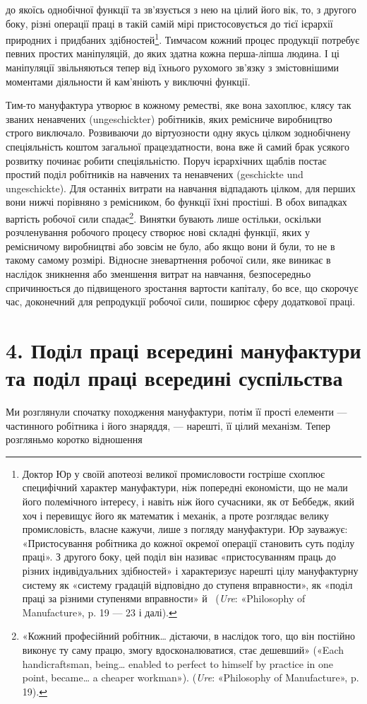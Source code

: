 \parcont{}  %
до якоїсь однобічної функції та зв’язується з нею на цілий його
вік, то, з другого боку, різні операції праці в такій самій мірі
пристосовується до тієї ієрархії природних і придбаних здібностей\footnote{
Доктор Юр у своїй апотеозі великої промисловости гостріше
схоплює специфічний характер мануфактури, ніж попередні економісти,
що не мали його полемічного інтересу, і навіть ніж його сучасники,
як от Беббедж, який хоч і перевищує його як математик і механік, а проте
розглядає велику промисловість, власне кажучи, лише з погляду мануфактури.
Юр зауважує: «Пристосування робітника до кожної окремої
операції становить суть поділу праці». З другого боку, цей поділ він називає
«пристосуванням праць до різних індивідуальних здібностей» і характеризує
нарешті цілу мануфактурну систему як «систему градацій
відповідно до ступеня вправности», як «поділ праці за різними ступенями
вправности» й~ (\emph{Ure}: «Philosophy of Manufacture», p. 19 —
23 і далі).
}. Тимчасом кожний процес продукції потребує певних
простих маніпуляцій, до яких здатна кожна перша-ліпша людина.
І ці маніпуляції звільняються тепер від їхнього рухомого
зв’язку з змістовнішими моментами діяльности й кам’яніють у
виключні функції.

Тим-то мануфактура утворює в кожному реместві, яке вона
захоплює, клясу так званих ненавчених (ungeschickter) робітників,
яких ремісниче виробництво строго виключало. Розвиваючи
до віртуозности одну якусь цілком зоднобічнену спеціяльність
коштом загальної працездатности, вона вже й самий брак усякого
розвитку починає робити спеціяльністю. Поруч ієрархічних
щаблів постає простий поділ робітників на навчених та ненавчених
(geschickte und ungeschickte). Для останніх витрати
на навчання відпадають цілком, для перших вони нижчі порівняно
з ремісником, бо функції їхні простіші. В обох випадках вартість
робочої сили спадає\footnote{
«Кожний професійний робітник\dots{} дістаючи, в наслідок того,
що він постійно виконує ту саму працю, змогу вдосконалюватися, стає
дешевший» («Each handicraftsman, being\dots{} enabled to perfect to himself
by practice in one point, became\dots{} a cheaper workman»). (\emph{Ure}:
«Philosophy of Manufacture», p. 19).
}. Винятки бувають лише остільки, оскільки
розчленування робочого процесу створює нові складні функції,
яких у ремісничому виробництві або зовсім не було, або якщо вони
й були, то не в такому самому розмірі. Відносне зневартнення
робочої сили, яке виникає в наслідок зникнення або зменшення
витрат на навчання, безпосередньо спричинюється до підвищеного
зростання вартости капіталу, бо все, що скорочує час, доконечний
для репродукції робочої сили, поширює сферу додаткової
праці.

\section*{4. Поділ праці всередині мануфактури та поділ праці
всередині суспільства}

Ми розглянули спочатку походження мануфактури, потім
її прості елементи — частинного робітника і його знаряддя, —
нарешті, її цілий механізм. Тепер розгляньмо коротко відношення
\parbreak{}  %
